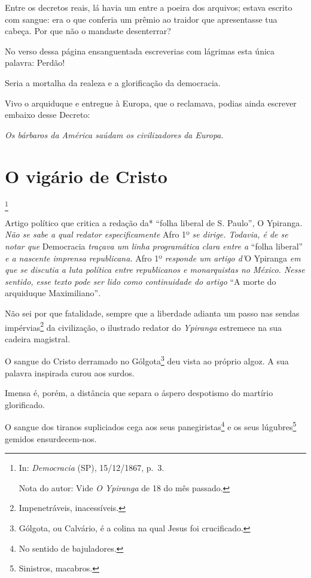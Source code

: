 Entre os decretos reais, lá havia um entre a poeira dos arquivos; estava
escrito com sangue: era o que conferia um prêmio ao traidor que
apresentasse tua cabeça. Por que não o mandaste desenterrar?

No verso dessa página ensanguentada escreverias com lágrimas esta única
palavra: Perdão!

Seria a mortalha da realeza e a glorificação da democracia.

Vivo o arquiduque e entregue à Europa, que o reclamava, podias ainda
escrever embaixo desse Decreto:

\emph{Os bárbaros da América saúdam os civilizadores da Europa}.

\chapter{O vigário de Cristo}\footnote{In: \emph{Democracia} (SP),
  15/12/1867, p.~3.

  Nota do autor: Vide \emph{O Ypiranga} de 18 do mês passado.}

\begin{didascalia}
Artigo político que critica a redação da* ``folha liberal de S.
Paulo''\emph{,} O Ypiranga\emph{. Não se sabe a qual redator
especificamente} Afro 1º \emph{se dirige. Todavia, é de se notar que}
Democracia \emph{traçava um linha programática clara entre a} ``folha
liberal'' \emph{e a nascente imprensa republicana.} Afro 1º
\emph{responde um artigo d'}O Ypiranga \emph{em que se discutia a luta
política entre republicanos e monarquistas no México. Nesse sentido,
esse texto pode ser lido como continuidade do artigo} ``A morte do
arquiduque Maximiliano''\emph{.}
\end{didascalia}

\asterisc{}

Não sei por que fatalidade, sempre que a liberdade adianta um passo nas
sendas impérvias\footnote{Impenetráveis, inacessíveis.} da
civilização, o ilustrado redator do \emph{Ypiranga} estremece na sua
cadeira magistral.

O sangue do Cristo derramado no Gólgota\footnote{Gólgota, ou Calvário,
  é a colina na qual Jesus foi crucificado.} deu vista ao próprio algoz.
A sua palavra inspirada curou aos surdos.

Imensa é, porém, a distância que separa o áspero despotismo do martírio
glorificado.

O sangue dos tiranos supliciados cega aos seus panegiristas\footnote{
  No sentido de bajuladores.} e os seus lúgubres\footnote{Sinistros,
  macabros.} gemidos ensurdecem-nos.

